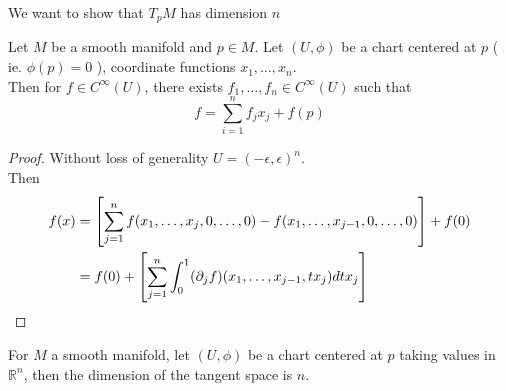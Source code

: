 \documentclass[../main.tex]{subfiles}
\begin{document}
We want to show that $T_pM$ has dimension $n$ 
\begin{lemma}
Let $M$ be a smooth manifold and $p\in M$. Let $( U,\phi) $ be a chart centered at $p$ ( ie. $\phi( p) =0$ ), coordinate functions $x_1,\ldots,x_n$.\\
Then for $f\in C^{ \infty }( U) $, there exists $f_1,\ldots,f_n\in C^{ \infty }( U) $ such that 
\[ 
f= \sum_{i=1}^{ n} f_j x_j + f( p) 
\]

\end{lemma}
\begin{proof}
Without loss of generality $U = ( -\epsilon,\epsilon)^{n}$.\\
Then
\begin{align*}
	f( x) &= \left[ \sum_{j=1}^{ n} f( x_1,\ldots,x_j,0,\ldots,0) - f( x_1,\ldots,x_{j-1} ,0,\ldots,0)  \right]+ f( 0) \\
	&= f( 0) + \left[ \sum_{j=1}^{ n} \int_{ 0 }^{ 1 } ( \partial_j f) ( x_1,\ldots,x_{j-1} , t x_j)dt x_j\right] 
\end{align*}
\end{proof}
\begin{thm}
	For $M$  a smooth manifold, let $( U,\phi) $ be a chart centered at $p$ taking values in $ \mathbb{R}^{n}$, then the dimension of the tangent space is $n$.
\end{thm}
\end{document}
